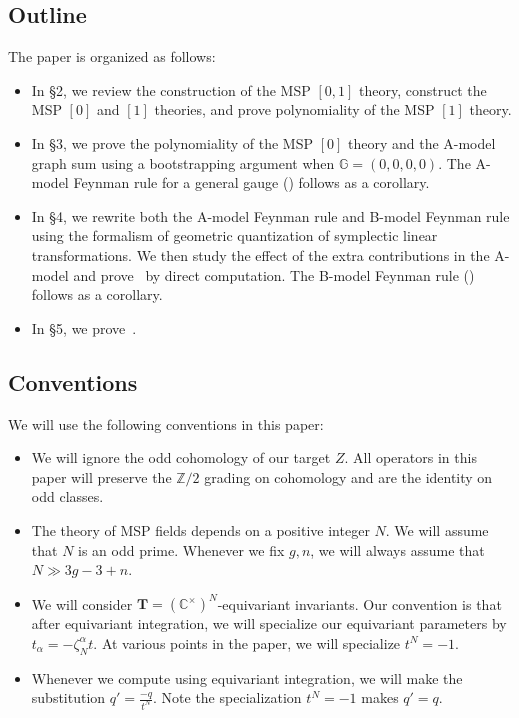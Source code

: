 \documentclass[10pt]{amsart}
\theoremstyle{definition}
\theoremstyle{remark}
\theoremstyle{plain}
\theoremstyle{definition}
\theoremstyle{remark}
\newcommand{\G}{\mathbb{G}}
\newcommand{\C}{\mathbb{C}}
\newcommand{\Z}{\mathbb{Z}}
\newcommand{\T}{\mathbf{T}}
\newcommand{\1}{\mathbf{1}}
\newcommand{\2}{\mathbf{2}}
\newcommand{\3}{\mathbf{3}}
\numberwithin{equation}{section}
\begin{document}
\subsection{Outline}%
\label{sub:Outline}
The paper is organized as follows:
\begin{itemize}
    \item In \S 2, we review the construction of the MSP $[0,1]$ theory, construct the MSP $[0]$ and $[1]$ theories, and prove polynomiality of the MSP $[1]$ theory.
    \item In \S 3, we prove the polynomiality of the MSP $[0]$ theory and the A-model graph sum using a bootstrapping argument when $\G = (0,0,0,0)$. The A-model Feynman rule for a general gauge () follows as a corollary.
    \item In \S 4, we rewrite both the A-model Feynman rule and B-model Feynman rule using the formalism of geometric quantization of symplectic linear transformations. We then study the effect of the extra contributions in the A-model and prove~ by direct computation. The B-model Feynman rule () follows as a corollary.
    \item In \S 5, we prove~.
\end{itemize}

\subsection{Conventions}%
\label{sub:Conventions}

We will use the following conventions in this paper:
\begin{itemize}
    \item We will ignore the odd cohomology of our target $Z$. All operators in this paper will preserve the $\Z/2$ grading on cohomology and are the identity on odd classes.
    \item The theory of MSP fields depends on a positive integer $N$. We will assume that $N$ is an odd prime. Whenever we fix $g,n$, we will always assume that $N \gg 3g-3+n$.
    \item We will consider $\T = (\C^{\times})^N$-equivariant invariants. Our convention is that after equivariant integration, we will specialize our equivariant parameters by $t_{\alpha} = -\zeta_N^{\alpha}t$. At various points in the paper, we will specialize $t^N = -1$.
    \item Whenever we compute using equivariant integration, we will make the substitution $q' = \frac{-q}{t^N}$. Note the specialization $t^N = -1$ makes $q' = q$.
\end{itemize}
\end{document}
